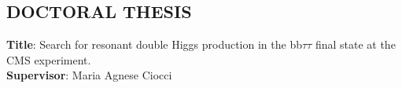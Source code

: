 \documentclass[12pt,a4paper,oneside]{extarticle}
\begin{document}
\begin{enumerate}

\end{enumerate}
\subsection*{DOCTORAL THESIS}

\noindent\textbf{Title}: Search for resonant double Higgs production in the bb$\tau\tau$ final state at the CMS experiment. \\

\noindent\textbf{Supervisor}: Maria Agnese Ciocci \\
\end{document}
